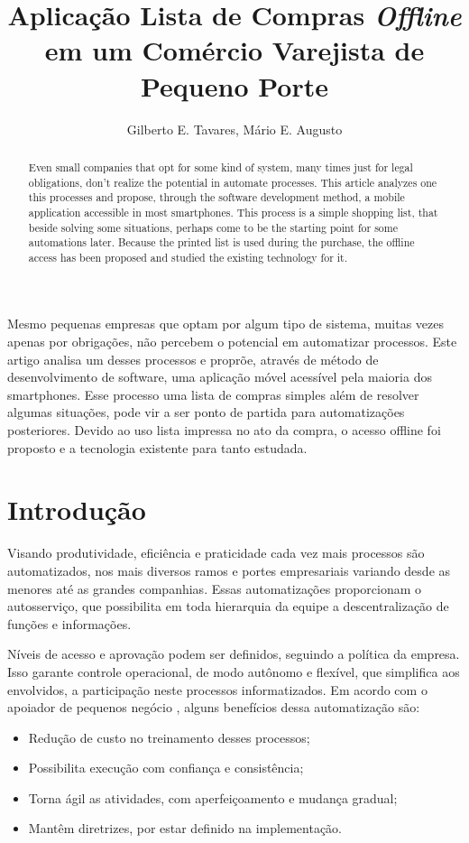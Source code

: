 \documentclass[12pt]{article}
\title{Aplicação Lista de Compras \textit{Offline}\\em um Comércio Varejista de Pequeno Porte}
\author{Gilberto E. Tavares\inst{1}, Mário E. Augusto\inst{1}}
\begin{document}
\maketitle

\begin{abstract}
Even small companies that opt for some kind of system, many times just for legal obligations, don't realize the potential in automate processes. This article analyzes one this processes and propose, through the software development method, a mobile application accessible in most smartphones. This process is a simple shopping list, that beside solving some situations, perhaps come to be the starting point for some automations later. Because the printed list is used during the purchase, the offline access has been proposed and studied the existing technology for it.
\end{abstract}

\begin{resumo}
Mesmo pequenas empresas que optam por algum tipo de sistema, muitas vezes apenas por obrigações, não percebem o potencial em automatizar processos. Este artigo analisa um desses processos e proprõe, através de método de desenvolvimento de software, uma aplicação móvel acessível pela maioria dos smartphones. Esse processo uma lista de compras simples além de resolver algumas situações, pode vir a ser ponto de partida para automatizações posteriores. Devido ao uso lista impressa no ato da compra, o acesso offline foi proposto e a tecnologia existente para tanto estudada.
\end{resumo}


\section{Introdução}

Visando produtividade, eficiência e praticidade cada vez mais processos são automatizados, nos mais diversos ramos e portes empresariais variando desde as menores até as grandes companhias. Essas automatizações proporcionam o autosserviço, que possibilita em toda hierarquia da equipe a descentralização de funções e informações.

Níveis de acesso e aprovação podem ser definidos, seguindo a política da empresa. Isso garante controle operacional, de modo autônomo e flexível, que simplifica aos envolvidos, a participação neste processos informatizados. Em acordo com o apoiador de pequenos negócio \cite{sebrae2015}, alguns benefícios dessa automatização são:
\begin{itemize}
\item Redução de custo no treinamento desses processos;
\item Possibilita execução com confiança e consistência;
\item Torna ágil as atividades, com aperfeiçoamento e mudança gradual;
\item Mantêm diretrizes, por estar definido na implementação.
\end{itemize}
\end{document}
